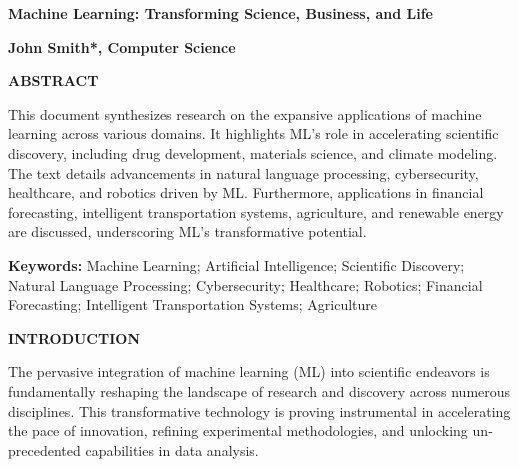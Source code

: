 \documentclass[11pt,a4paper]{article}
\newcommand{\contentfont}{\fontsize{11}{13}\selectfont}
\newcommand{\titlefont}{\fontsize{17}{22}\bfseries\selectfont}
\newcommand{\subheadingfont}{\fontsize{11}{13}\bfseries\selectfont}
\begin{document}
\contentfont

\begin{center}
    {\titlefont Machine Learning: Transforming Science, Business, and Life\par}

    \vspace{1.2em}

    {\fontsize{13}{10}\selectfont\noindent\textbf{John Smith*, Computer Science}}

    \vspace{1.2em}

    {\subheadingfont ABSTRACT}
\end{center}

\vspace{0.2em}

\begingroup
\itshape
\begin{otherlanguage}{english}
This document synthesizes research on the expansive applications of machine learning across various domains. It highlights ML's role in accelerating scientific discovery, including drug development, materials science, and climate modeling. The text details advancements in natural language processing, cybersecurity, healthcare, and robotics driven by ML. Furthermore, applications in financial forecasting, intelligent transportation systems, agriculture, and renewable energy are discussed, underscoring ML's transformative potential.
\end{otherlanguage}
\par
\endgroup

\vspace{1em}

\noindent\textbf{Keywords:} Machine Learning; Artificial Intelligence; Scientific Discovery; Natural Language Processing; Cybersecurity; Healthcare; Robotics; Financial Forecasting; Intelligent Transportation Systems; Agriculture

\vspace{1em}

\begin{center}
    {\subheadingfont INTRODUCTION}
\end{center}

\vspace{0.2em}

\begin{otherlanguage}{english}
The pervasive integration of machine learning (ML) into scientific endeavors is fundamentally reshaping the landscape of research and discovery across numerous disciplines. This transformative technology is proving instrumental in accelerating the pace of innovation, refining experimental methodologies, and unlocking unprecedented capabilities in data analysis.
\end{otherlanguage}
\end{document}
